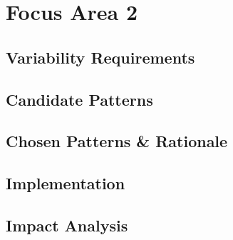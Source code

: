 \section{Focus Area 2}\label{sec:focus_area_2}

\subsection{Variability Requirements}\label{sec:variability_requirements_2}

\subsection{Candidate Patterns}\label{sec:candidate_patterns_2}

\subsection{Chosen Patterns \& Rationale}\label{sec:chosen_patterns_rationale_2}

\subsection{Implementation}\label{sec:implementation_2}

\subsection{Impact Analysis}\label{sec:impact_analysis_2}

